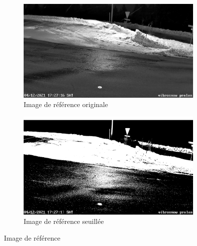 \begin{figure}[H]
    \begin{subfigure}{.45\textwidth}
        \includegraphics[width=\linewidth]{Images/computer_vision/snowOnRoad/ref_original.png}
        \caption{Image de référence originale}
        \label{fig:SnowOnRoad_ref_original}
    \end{subfigure}
    \hfill
    \begin{subfigure}{.45\textwidth}
        \includegraphics[width=\linewidth]{Images/computer_vision/snowOnRoad/ref_thres.png}
        \caption{Image de référence seuillée}
        \label{fig:SnowOnRoad_ref_thres}
    \end{subfigure}
    \caption{Image de référence}
    \label{fig:SnowOnRoad_ref}
\end{figure}

